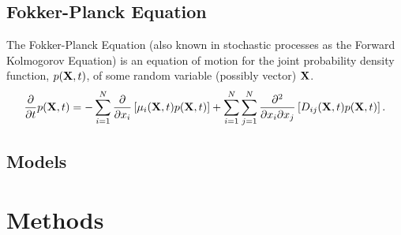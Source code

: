 \documentclass[12pt]{article}
\begin{document}
\subsection{Fokker-Planck Equation}

The Fokker-Planck Equation (also known in stochastic processes as the Forward Kolmogorov Equation) is an equation of motion for the joint probability density function, $p(\vb{X}, t)$, of some random variable (possibly vector) $\vb{X}$. 
\begin{align}
    \pdv{t}p(\vb{X},t) = -\sum\limits_{i=1}^{N}\pdv{x_{i}}\left[\mu_{i}(\vb{X},t)p(\vb{X},t)\right] + \sum\limits_{i=1}^{N}\sum\limits_{j=1}^{N}\pdv{}{x_{i}}{x_{j}}\left[D_{ij}(\vb{X},t)p(\vb{X},t)\right].\label{eq:fpe_general}
\end{align}

\subsection{Models}

 
 \section{Methods}
\end{document}
